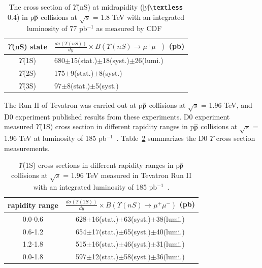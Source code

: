 \begin{table}
  \begin{center}
    \caption[]{The cross section of $\Upsilon$(nS) at midrapidity
($|y|\textless$ 0.4) in p$\overline{\rm p}$ collisions at $\surd s$ = 1.8 TeV with
an integrated luminosity of 77 pb$^{-1}$ as measured by CDF~\cite{CDF:2001fdy}}
\label{Tab:YCrossCDF02}
\begin{tabular}{cl} 
\hline 
\hline
$\Upsilon$(nS) state             &$\frac{d\sigma(\Upsilon(nS))}{dy}\times B(\Upsilon(nS)\rightarrow\mu^{+}\mu^{-})$ (pb)    \\              
\hline
$\Upsilon$(1S)                   &680$\pm$15(stat.)$\pm$18(syst.)$\pm$26(lumi.)\\
$\Upsilon$(2S)                   &175$\pm$9(stat.)$\pm$8(syst.)\\
$\Upsilon$(3S)                   &97$\pm$8(stat.)$\pm$5(syst.)\\   
\hline
\hline
\end{tabular}
\end{center}
\end{table}

The Run II of Tevatron was carried out at p$\overline{\rm p}$ collisions at
$\surd s$ = 1.96 TeV, and D0 experiment published results from these
experiments.
D0 experiment measured $\Upsilon$(1S) cross section in different 
rapidity ranges in p$\overline{\rm p}$ collisions at $\surd s$  = 1.96 TeV 
at luminosity of 185 pb$^{-1}$~\cite{D0:2005klj}.
Table~\ref{Tab:YCrossD0RunII} summarizes the D0 $\Upsilon$ cross section
measurements.


\begin{table}
 \begin{center}
   \caption[]{ $\Upsilon$(1S) cross sections in different rapidity ranges in p$\overline{\rm p}$
     collisions at $\surd s$ = 1.96 TeV measured in Tevatron Run II with an integrated luminosity
     of 185 pb$^{-1}$~\cite{D0:2005klj}. }
\label{Tab:YCrossD0RunII}
\begin{tabular}{cc} 
\hline 
\hline
rapidity range             &$\frac{d\sigma(\Upsilon(1S))}{dy}\times B(\Upsilon(nS)\rightarrow\mu^{+}\mu^{-})$ (pb)    \\              
\hline
0.0-0.6                   &628$\pm$16(stat.)$\pm$63(syst.)$\pm$38(lumi.)\\
0.6-1.2                   &654$\pm$17(stat.)$\pm$65(syst.)$\pm$40(lumi.)\\
1.2-1.8                   &515$\pm$16(stat.)$\pm$46(syst.)$\pm$31(lumi.)\\
0.0-1.8                   &597$\pm$12(stat.)$\pm$58(syst.)$\pm$36(lumi.)\\
\hline
\hline
\end{tabular}
\end{center}
\end{table}

